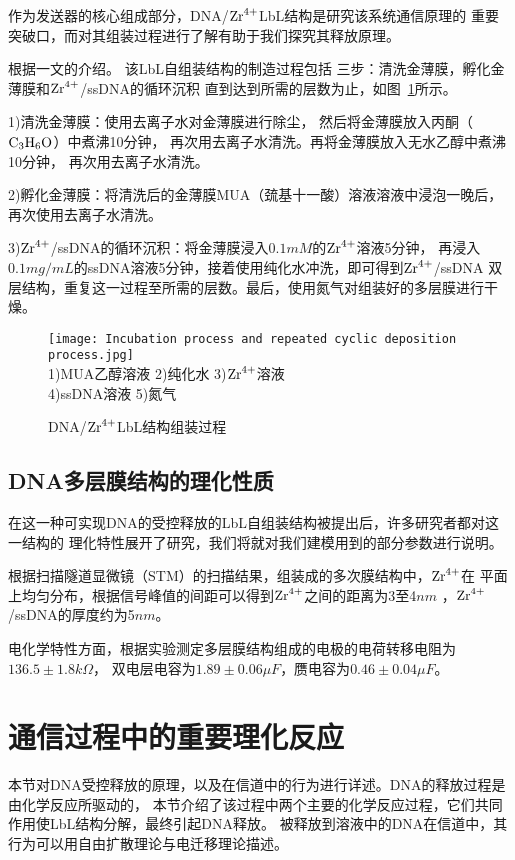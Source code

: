 作为发送器的核心组成部分，DNA/$\ce{Zr^4+}$LbL结构是研究该系统通信原理的
重要突破口，而对其组装过程进行了解有助于我们探究其释放原理。


根据\parencite{bm800766t}一文的介绍。
该LbL自组装结构的制造过程包括
三步：清洗金薄膜，孵化金
薄膜和$\ce{Zr^{4+}}$/ssDNA的循环沉积
直到达到所需的层数为止，如图~\ref{fig:incubation_process}所示。

1)清洗金薄膜：使用去离子水对金薄膜进行除尘，
然后将金薄膜放入丙酮（$\ce{C3H6O}$）中煮沸10分钟，
再次用去离子水清洗。再将金薄膜放入无水乙醇中煮沸10分钟，
再次用去离子水清洗。

2)孵化金薄膜：将清洗后的金薄膜MUA（巯基十一酸）溶液溶液中浸泡一晚后，
再次使用去离子水清洗。

3)$\ce{Zr^{4+}}$/ssDNA的循环沉积：将金薄膜浸入$0.1mM$的$\ce{Zr^{4+}}$溶液5分钟，
再浸入$0.1mg/mL$的ssDNA溶液5分钟，接着使用纯化水冲洗，即可得到$\ce{Zr^{4+}}$/ssDNA
双层结构，重复这一过程至所需的层数。最后，使用氮气对组装好的多层膜进行干燥。

\begin{figure}[htb]
    \centering
    \texttt{[image: Incubation process and repeated cyclic deposition process.jpg]}\\
    1)MUA乙醇溶液 2)纯化水 3)$\ce{Zr^{4+}}$溶液 \\
    4)ssDNA溶液 5)氮气\\
    \caption{DNA/$\ce{Zr^{4+}}$LbL结构组装过程}
    \label{fig:incubation_process}
\end{figure}

\subsection{DNA多层膜结构的理化性质}
在这一种可实现DNA的受控释放的LbL自组装结构被提出后，许多研究者都对这一结构的
理化特性展开了研究，我们将就对我们建模用到的部分参数进行说明。

根据扫描隧道显微镜（STM）的扫描结果，组装成的多次膜结构中，$\ce{Zr^{4+}}$在
平面上均匀分布，根据信号峰值的间距可以得到$\ce{Zr^{4+}}$之间的距离为3至4$nm$
，$\ce{Zr^{4+}}$/ssDNA的厚度约为5$nm$\cite{Shervedani2011Electrochemical}。

电化学特性方面，根据实验测定\cite{Karimi2011}多层膜结构组成的电极的电荷转移电阻为$136.5\pm1.8k\Omega$，
双电层电容为$1.89\pm0.06\mu F$，赝电容为$0.46\pm0.04\mu F$。


\section{通信过程中的重要理化反应}
本节对DNA受控释放的原理，以及在信道中的行为进行详述。DNA的释放过程是由化学反应所驱动的，
本节介绍了该过程中两个主要的化学反应过程，它们共同作用使LbL结构分解，最终引起DNA释放。
被释放到溶液中的DNA在信道中，其行为可以用自由扩散理论与电迁移理论描述。

